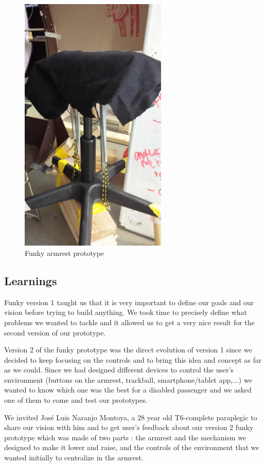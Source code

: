 \begin{figure}[h]
  \centering
     \includegraphics[width=7cm]{images/armrest_funky.jpg}
   \caption{Funky armrest prototype}
  \label{fig:armrest_funky}
\end{figure}


\subsection{Learnings}

Funky version 1 taught us that it is very important to define our goals and our vision before trying to build anything. We took time to precisely define what problems we wanted to tackle and it allowed us to get a very nice result for the second version of our prototype.

Version 2 of the funky prototype was the direct evolution of version 1 since we decided to keep focusing on the controls and to bring this idea and concept as far as we could. Since we had designed different devices to control the user's environment (buttons on the armrest, trackball, smartphone/tablet app,...) we wanted to know which one was the best for a disabled passenger and we asked one of them to come and test our prototypes.

We invited José Luis Naranjo Montoya, a 28 year old T6-complete paraplegic to share our vision with him and to get user's feedback about our version 2 funky prototype which was made of two parts : the armrest and the mechanism we designed to make it lower and raise, and the controls of the environment that we wanted initially to centralize in the armrest.

